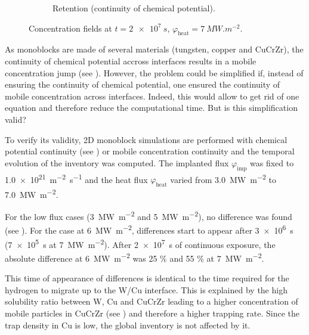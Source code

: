 \begin{figure}
\begin{subfigure}{0.5\linewidth}
        \caption{Retention (continuity of chemical potential).}
    \end{subfigure}
    \caption{Concentration fields at $t=\SI{2e7}{s}$, $\varphi_\mathrm{heat} = \SI{7}{MW.m^{-2}}$.}
\end{figure}

As monoblocks are made of several materials (tungsten, copper and CuCrZr), the continuity of chemical potential accross interfaces results in a mobile concentration jump (see ).
However, the problem could be simplified if, instead of ensuring the continuity of chemical potential, one ensured the continuity of mobile concentration across interfaces.
Indeed, this would allow to get rid of one equation and therefore reduce the computational time.
But is this simplification valid?

To verify its validity, 2D monoblock simulations are performed with chemical potential continuity (see ) or mobile concentration continuity and the temporal evolution of the inventory was computed.
The implanted flux $\varphi_\mathrm{imp}$ was fixed to \SI{1.0e21}{m^{-2}.s^{-1}} and the heat flux $\varphi_\mathrm{heat}$ varied from \SI{3.0}{MW.m^{-2}} to \SI{7.0}{MW.m^{-2}}.

For the low flux cases (\SI{3}{MW.m^{-2}} and \SI{5}{MW.m^{-2}}), no difference was found (see ).
For the case at \SI{6}{MW.m^{-2}}, differences start to appear after \SI{3e6}{s} (\SI{7e5}{s} at \SI{7}{MW.m^{-2}}).
After \SI{2e7}{s} of continuous exposure, the absolute difference at \SI{6}{MW.m^{-2}} was 25 \% and 55 \% at \SI{7}{MW.m^{-2}}.

This time of appearance of differences is identical to the time required for the hydrogen to migrate up to the W/Cu interface.
This is explained by the high solubility ratio between W, Cu and CuCrZr leading to a higher concentration of mobile particles in CuCrZr (see ) and therefore a higher trapping rate.
Since the trap density in Cu is low, the global inventory is not affected by it.


